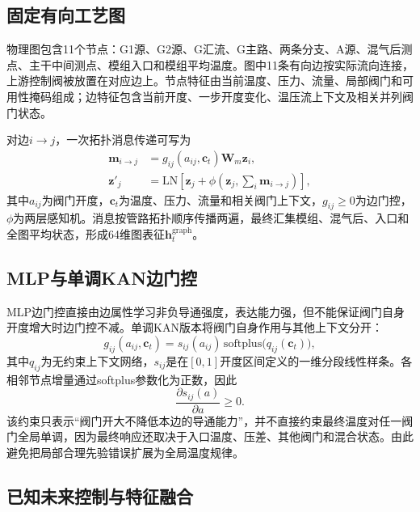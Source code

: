 \documentclass[a4paper,fleqn]{cas-dc}
\newcommand{\vect}[1]{\boldsymbol{#1}}
\begin{document}
\subsection{固定有向工艺图}

物理图包含11个节点：G1源、G2源、G汇流、G主路、两条分支、A源、混气后测点、主干中间测点、模组入口和模组平均温度。图中11条有向边按实际流向连接，上游控制阀被放置在对应边上。节点特征由当前温度、压力、流量、局部阀门和可用性掩码组成；边特征包含当前开度、一步开度变化、温压流上下文及相关并列阀门状态。

对边$i\rightarrow j$，一次拓扑消息传递可写为
\begin{equation}
\begin{aligned}
\vect m_{i\rightarrow j}
  &=g_{ij}(a_{ij},\vect c_t)\vect W_m\vect z_i,\\
\vect z'_j
  &=\mathrm{LN}\!\left[\vect z_j+
    \phi\!\left(\vect z_j,\sum_i\vect m_{i\rightarrow j}\right)\right],
\end{aligned}
\label{eq:message}
\end{equation}
其中$a_{ij}$为阀门开度，$\vect c_t$为温度、压力、流量和相关阀门上下文，$g_{ij}\geq0$为边门控，$\phi$为两层感知机。消息按管路拓扑顺序传播两遍，最终汇集模组、混气后、入口和全图平均状态，形成64维图表征$\vect h_t^{\mathrm{graph}}$。

\subsection{MLP与单调KAN边门控}

MLP边门控直接由边属性学习非负导通强度，表达能力强，但不能保证阀门自身开度增大时边门控不减。单调KAN版本将阀门自身作用与其他上下文分开：
\begin{equation}
g_{ij}(a_{ij},\vect c_t)=s_{ij}(a_{ij})\,\mathrm{softplus}\bigl(q_{ij}(\vect c_t)\bigr),
\end{equation}
其中$q_{ij}$为无约束上下文网络，$s_{ij}$是在$[0,1]$开度区间定义的一维分段线性样条。各相邻节点增量通过softplus参数化为正数，因此
\begin{equation}
\frac{\partial s_{ij}(a)}{\partial a}\geq0.
\end{equation}
该约束只表示“阀门开大不降低本边的导通能力”，并不直接约束最终温度对任一阀门全局单调，因为最终响应还取决于入口温度、压差、其他阀门和混合状态。由此避免把局部合理先验错误扩展为全局温度规律。

\subsection{已知未来控制与特征融合}
\end{document}
